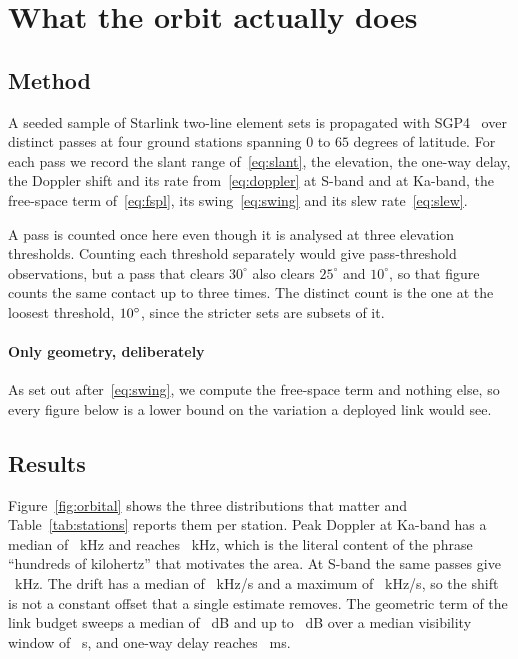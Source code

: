\documentclass[preprint,11pt,3p]{elsarticle}
\begin{document}
\section{What the orbit actually does}
\label{sec:orbit}

\subsection{Method}

A seeded sample of \numSats{} Starlink two-line element sets is propagated with
SGP4~\cite{vallado2006sgp4} over
\numPasses{} distinct passes at four ground stations spanning $0$ to $65$ degrees of latitude.
For each pass we record the slant range of~\eqref{eq:slant}, the elevation, the one-way delay,
the Doppler shift and its rate from~\eqref{eq:doppler} at S-band and at Ka-band, the free-space
term of~\eqref{eq:fspl}, its swing~\eqref{eq:swing} and its slew rate~\eqref{eq:slew}.

A pass is counted once here even though it is analysed at three elevation thresholds. Counting
each threshold separately would give \numPassObs{} pass-threshold observations, but a pass that
clears $30^\circ$ also clears $25^\circ$ and $10^\circ$, so that figure counts the same contact
up to three times. The distinct count is the one at the loosest threshold,
$10^\circ$, since the stricter sets are subsets of it.

\paragraph{Only geometry, deliberately}
As set out after~\eqref{eq:swing}, we compute the free-space term and nothing else, so every
figure below is a lower bound on the variation a deployed link would see.

\subsection{Results}

Figure~\ref{fig:orbital} shows the three distributions that matter and
Table~\ref{tab:stations} reports them per station. Peak Doppler at Ka-band has a median of
\numDopKaMed~kHz and reaches \numDopKaMax~kHz, which is the literal content of the phrase
``hundreds of kilohertz'' that motivates the area. At S-band the same passes give
\numDopS~kHz. The drift has a median of \numDopRate~kHz/s and a maximum of
\numDopRateMax~kHz/s, so the shift is not a constant offset that a single estimate removes. The
geometric term of the link budget sweeps a median of \numFsplMed~dB and up to \numFsplMax~dB
over a median visibility window of \numDurMed~s, and one-way delay reaches \numOwd~ms.
\end{document}
